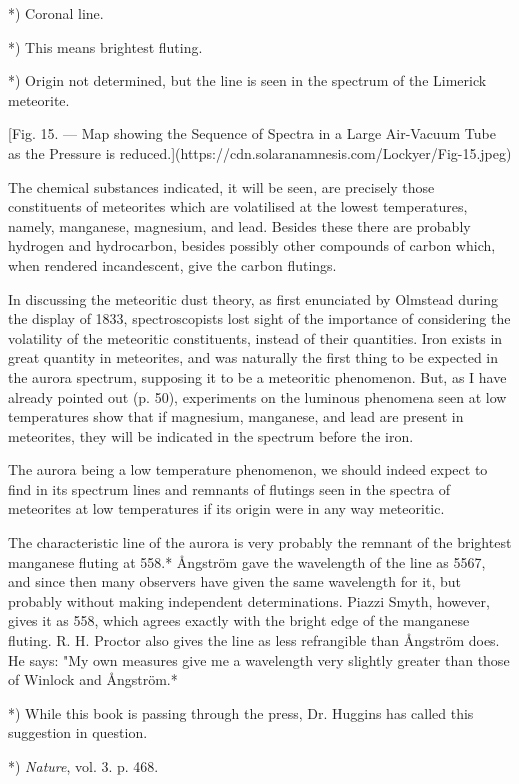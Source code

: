 \documentclass[a4paper, 12pt, oneside, polutonikogreek, english]{article}
\begin{document}
*) Coronal line.

*) This means brightest fluting.

*) Origin not determined, but the line is seen in the spectrum of the Limerick meteorite.

[Fig. 15. --- Map showing the Sequence of Spectra in a Large Air-Vacuum Tube as the Pressure is reduced.](https://cdn.solaranamnesis.com/Lockyer/Fig-15.jpeg)

The chemical substances indicated, it will be seen, are precisely those constituents of meteorites which are volatilised at the lowest temperatures, namely, manganese, magnesium, and lead. Besides these there are probably hydrogen and hydrocarbon, besides possibly other compounds of carbon which, when rendered incandescent, give the carbon flutings.

In discussing the meteoritic dust theory, as first enunciated by Olmstead during the display of 1833, spectroscopists lost sight of the importance of considering the volatility of the meteoritic constituents, instead of their quantities. Iron exists in great quantity in meteorites, and was naturally the first thing to be expected in the aurora spectrum, supposing it to be a meteoritic phenomenon. But, as I have already pointed out (p. 50), experiments on the luminous phenomena seen at low temperatures show that if magnesium, manganese, and lead are present in meteorites, they will be indicated in the spectrum before the iron.

The aurora being a low temperature phenomenon, we should indeed expect to find in its spectrum lines and remnants of flutings seen in the spectra of meteorites at low temperatures if its origin were in any way meteoritic.

The characteristic line of the aurora is very probably the remnant of the brightest manganese fluting at 558.* Ångström gave the wavelength of the line as 5567, and since then many observers have given the same wavelength for it, but probably without making independent determinations. Piazzi Smyth, however, gives it as 558, which agrees exactly with the bright edge of the manganese fluting. R. H. Proctor also gives the line as less refrangible than Ångström does. He says: "My own measures give me a wavelength very slightly greater than those of Winlock and Ångström.*

*) While this book is passing through the press, Dr. Huggins has called this suggestion in question.

*) \emph{Nature}, vol. 3. p. 468.
\end{document}
